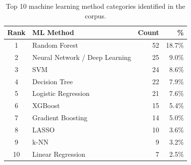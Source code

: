 \begin{table}[htbp]
  \centering
  \caption{Top 10 machine learning method categories identified in the corpus.}
  \label{tab:ml_methods}
  \begin{tabular}{clrr}
    \toprule
    Rank & ML Method & Count & \% \\
    \midrule
    1 & Random Forest & 52 & 18.7\% \\
    2 & Neural Network / Deep Learning & 25 & 9.0\% \\
    3 & SVM & 24 & 8.6\% \\
    4 & Decision Tree & 22 & 7.9\% \\
    5 & Logistic Regression & 21 & 7.6\% \\
    6 & XGBoost & 15 & 5.4\% \\
    7 & Gradient Boosting & 14 & 5.0\% \\
    8 & LASSO & 10 & 3.6\% \\
    9 & k-NN & 9 & 3.2\% \\
    10 & Linear Regression & 7 & 2.5\% \\
    \bottomrule
  \end{tabular}
\end{table}